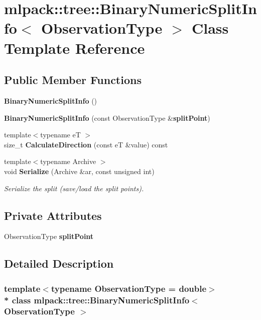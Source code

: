 \section{mlpack\+:\+:tree\+:\+:Binary\+Numeric\+Split\+Info$<$ Observation\+Type $>$ Class Template Reference}
\label{classmlpack_1_1tree_1_1BinaryNumericSplitInfo}
\subsection*{Public Member Functions}
\begin{DoxyCompactItemize}
\item 
{\bf Binary\+Numeric\+Split\+Info} ()
\item 
{\bf Binary\+Numeric\+Split\+Info} (const Observation\+Type \&{\bf split\+Point})
\item 
{\footnotesize template$<$typename eT $>$ }\\size\+\_\+t {\bf Calculate\+Direction} (const eT \&value) const 
\item 
{\footnotesize template$<$typename Archive $>$ }\\void {\bf Serialize} (Archive \&ar, const unsigned int)
\begin{DoxyCompactList}\small\item\em Serialize the split (save/load the split points). \end{DoxyCompactList}\end{DoxyCompactItemize}
\subsection*{Private Attributes}
\begin{DoxyCompactItemize}
\item 
Observation\+Type {\bf split\+Point}
\end{DoxyCompactItemize}


\subsection{Detailed Description}
\subsubsection*{template$<$typename Observation\+Type = double$>$\\*
class mlpack\+::tree\+::\+Binary\+Numeric\+Split\+Info$<$ Observation\+Type $>$}



